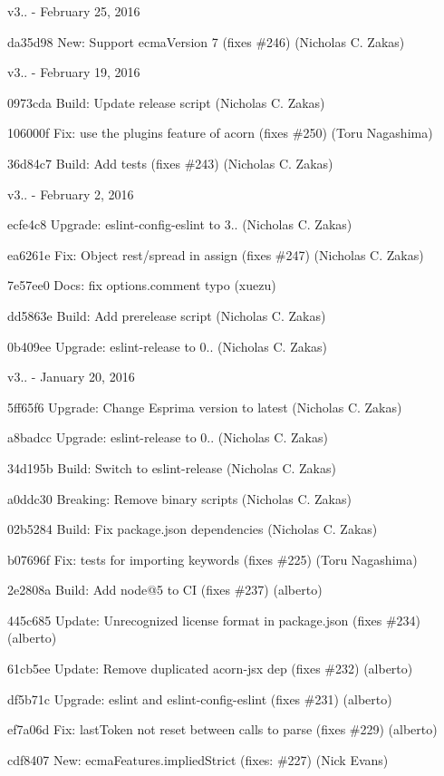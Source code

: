 v3.. -\/ February 25, 2016


\begin{DoxyItemize}
\item da35d98 New\+: Support ecma\+Version 7 (fixes \#246) (Nicholas C. Zakas)
\end{DoxyItemize}

v3.. -\/ February 19, 2016


\begin{DoxyItemize}
\item 0973cda Build\+: Update release script (Nicholas C. Zakas)
\item 106000f Fix\+: use the plugins feature of acorn (fixes \#250) (Toru Nagashima)
\item 36d84c7 Build\+: Add tests (fixes \#243) (Nicholas C. Zakas)
\end{DoxyItemize}

v3.. -\/ February 2, 2016


\begin{DoxyItemize}
\item ecfe4c8 Upgrade\+: eslint-\/config-\/eslint to 3.. (Nicholas C. Zakas)
\item ea6261e Fix\+: Object rest/spread in assign (fixes \#247) (Nicholas C. Zakas)
\item 7e57ee0 Docs\+: fix {\ttfamily options.\+comment} typo (xuezu)
\item dd5863e Build\+: Add prerelease script (Nicholas C. Zakas)
\item 0b409ee Upgrade\+: eslint-\/release to 0.. (Nicholas C. Zakas)
\end{DoxyItemize}

v3.. -\/ January 20, 2016


\begin{DoxyItemize}
\item 5ff65f6 Upgrade\+: Change Esprima version to latest (Nicholas C. Zakas)
\item a8badcc Upgrade\+: eslint-\/release to 0.. (Nicholas C. Zakas)
\item 34d195b Build\+: Switch to eslint-\/release (Nicholas C. Zakas)
\item a0ddc30 Breaking\+: Remove binary scripts (Nicholas C. Zakas)
\item 02b5284 Build\+: Fix package.\+json dependencies (Nicholas C. Zakas)
\item b07696f Fix\+: tests for importing keywords (fixes \#225) (Toru Nagashima)
\item 2e2808a Build\+: Add node@5 to CI (fixes \#237) (alberto)
\item 445c685 Update\+: Unrecognized license format in package.\+json (fixes \#234) (alberto)
\item 61cb5ee Update\+: Remove duplicated acorn-\/jsx dep (fixes \#232) (alberto)
\item df5b71c Upgrade\+: eslint and eslint-\/config-\/eslint (fixes \#231) (alberto)
\item ef7a06d Fix\+: last\+Token not reset between calls to parse (fixes \#229) (alberto)
\item cdf8407 New\+: ecma\+Features.\+implied\+Strict (fixes\+: \#227) (Nick Evans)
\end{DoxyItemize}

